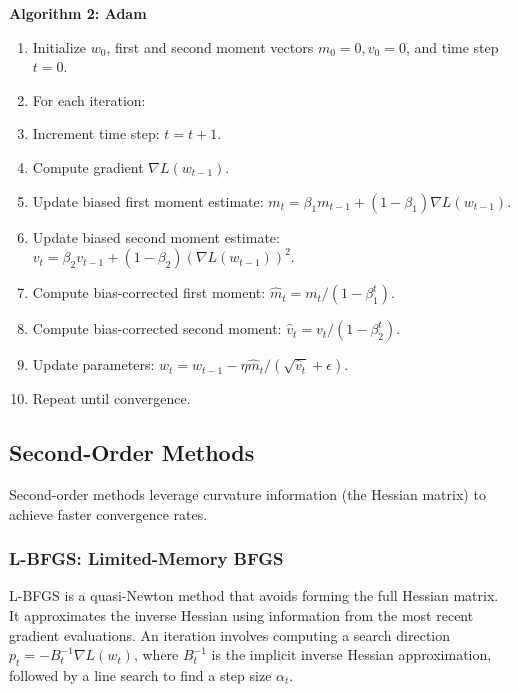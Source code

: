\documentclass[20pt]{article}
\begin{document}
\textbf{Algorithm 2: Adam}
\begin{enumerate}
    \item Initialize $w_0$, first and second moment vectors $m_0=0, v_0=0$, and time step $t=0$.
    \item For each iteration:
    \item \quad Increment time step: $t = t + 1$.
    \item \quad Compute gradient $\nabla L(w_{t-1})$.
    \item \quad Update biased first moment estimate: $m_t = \beta_1 m_{t-1} + (1-\beta_1) \nabla L(w_{t-1})$.
    \item \quad Update biased second moment estimate: $v_t = \beta_2 v_{t-1} + (1-\beta_2) (\nabla L(w_{t-1}))^2$.
    \item \quad Compute bias-corrected first moment: $\hat{m}_t = m_t / (1-\beta_1^t)$.
    \item \quad Compute bias-corrected second moment: $\hat{v}_t = v_t / (1-\beta_2^t)$.
    \item \quad Update parameters: $w_t = w_{t-1} - \eta \hat{m}_t / (\sqrt{\hat{v}_t} + \epsilon)$.
    \item Repeat until convergence.
\end{enumerate}


\subsection{Second-Order Methods}
Second-order methods leverage curvature information (the Hessian matrix) to achieve faster convergence rates.

\subsubsection{L-BFGS: Limited-Memory BFGS}
L-BFGS \cite{Nocedal1989LBFGS} is a quasi-Newton method that avoids forming the full Hessian matrix. It approximates the inverse Hessian using information from the most recent gradient evaluations. An iteration involves computing a search direction $p_t = -B_t^{-1} \nabla L(w_t)$, where $B_t^{-1}$ is the implicit inverse Hessian approximation, followed by a line search to find a step size $\alpha_t$.
\end{document}
